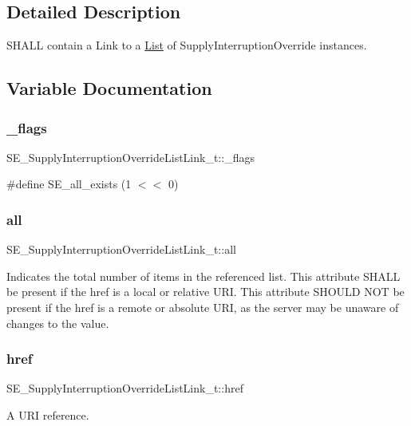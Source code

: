 \subsection{Detailed Description}
S\+H\+A\+LL contain a Link to a \hyperlink{structList}{List} of Supply\+Interruption\+Override instances. 

\subsection{Variable Documentation}
\mbox{\label{group__SupplyInterruptionOverrideListLink_ga783e5fcd44df840ad1e21c12f1e80b97}} 
\subsubsection{\texorpdfstring{\+\_\+flags}{\_flags}}
{\footnotesize\ttfamily S\+E\+\_\+\+Supply\+Interruption\+Override\+List\+Link\+\_\+t\+::\+\_\+flags}

\#define S\+E\+\_\+all\+\_\+exists (1 $<$$<$ 0) \mbox{\label{group__SupplyInterruptionOverrideListLink_gae549a06d4bf58047ec9444e7b35a1062}} 
\subsubsection{\texorpdfstring{all}{all}}
{\footnotesize\ttfamily S\+E\+\_\+\+Supply\+Interruption\+Override\+List\+Link\+\_\+t\+::all}

Indicates the total number of items in the referenced list. This attribute S\+H\+A\+LL be present if the href is a local or relative U\+RI. This attribute S\+H\+O\+U\+LD N\+OT be present if the href is a remote or absolute U\+RI, as the server may be unaware of changes to the value. \mbox{\label{group__SupplyInterruptionOverrideListLink_gafbb7661ea1af8a68f693a16f93f56a30}} 
\subsubsection{\texorpdfstring{href}{href}}
{\footnotesize\ttfamily S\+E\+\_\+\+Supply\+Interruption\+Override\+List\+Link\+\_\+t\+::href}

A U\+RI reference. 